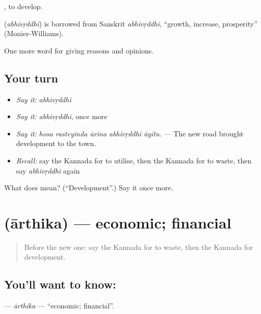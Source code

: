  , to develop.

\begin{cousinweb}
\textbf{} (\emph{abhivṛddhi}) is borrowed from Sanskrit \emph{abhivṛddhi}, \textquotedblleft{}growth, increase, prosperity\textquotedblright{} (Monier-Williams).
\end{cousinweb}

\begin{grammarlens}[title={What you've built}]
One more word for giving reasons and opinions.
\end{grammarlens}

\subsection*{Your turn}
\begin{itemize}
\raggedright
  \item \emph{Say it:} \emph{abhivṛddhi}
  \item \emph{Say it:} \emph{abhivṛddhi}, once more
  \item \emph{Say it:} \emph{hosa rasteyinda ūrina abhivṛddhi āyitu.} — The new road brought development to the town.
  \item \emph{Recall:} say the Kannada for to utilise, then the Kannada for to waste, then say \emph{abhivṛddhi} again
\end{itemize}

\begin{tcolorbox}[breakable,colback=teal!4,colframe=teal!35!black,title={Before you move on}]
What does  mean? (\textquotedblleft{}Development\textquotedblright{}.) Say it once more.
\end{tcolorbox}
\section[\texorpdfstring{\kn{ಆರ್ಥಿಕ} (ārthika)}{ಆರ್ಥಿಕ (ārthika)}]{ (ārthika) — economic; financial}

\label{lesson:KA-C401-arthika}



\begin{quote}
Before the new one: say the Kannada for to waste, then the Kannada for development.
\end{quote}

\subsection*{You'll want to know: }
\textbf{} — \emph{ārthika} — \textquotedblleft{}economic; financial\textquotedblright{}.

